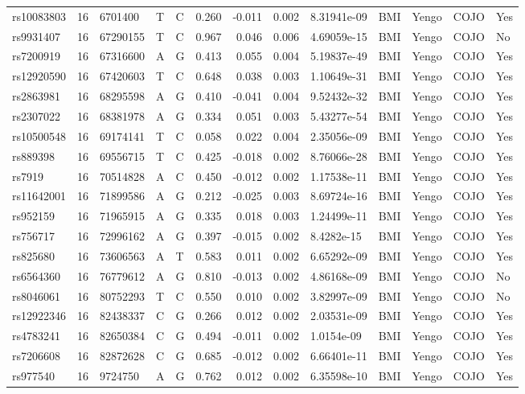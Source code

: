\documentclass[11pt,twoside]{bristolthesis}
\begin{document}
\begin{longtable}[t]{lrlllrrrlllll}
\addlinespace
rs10083803 & 16 & 6701400 & T & C & 0.260 & -0.011 & 0.002 & 8.31941e-09 & BMI & Yengo & COJO & Yes\\
rs9931407 & 16 & 67290155 & T & C & 0.967 & 0.046 & 0.006 & 4.69059e-15 & BMI & Yengo & COJO & No\\
rs7200919 & 16 & 67316600 & A & G & 0.413 & 0.055 & 0.004 & 5.19837e-49 & BMI & Yengo & COJO & Yes\\
rs12920590 & 16 & 67420603 & T & C & 0.648 & 0.038 & 0.003 & 1.10649e-31 & BMI & Yengo & COJO & Yes\\
rs2863981 & 16 & 68295598 & A & G & 0.410 & -0.041 & 0.004 & 9.52432e-32 & BMI & Yengo & COJO & Yes\\
\addlinespace
rs2307022 & 16 & 68381978 & A & G & 0.334 & 0.051 & 0.003 & 5.43277e-54 & BMI & Yengo & COJO & Yes\\
rs10500548 & 16 & 69174141 & T & C & 0.058 & 0.022 & 0.004 & 2.35056e-09 & BMI & Yengo & COJO & Yes\\
rs889398 & 16 & 69556715 & T & C & 0.425 & -0.018 & 0.002 & 8.76066e-28 & BMI & Yengo & COJO & Yes\\
rs7919 & 16 & 70514828 & A & C & 0.450 & -0.012 & 0.002 & 1.17538e-11 & BMI & Yengo & COJO & Yes\\
rs11642001 & 16 & 71899586 & A & G & 0.212 & -0.025 & 0.003 & 8.69724e-16 & BMI & Yengo & COJO & Yes\\
\addlinespace
rs952159 & 16 & 71965915 & A & G & 0.335 & 0.018 & 0.003 & 1.24499e-11 & BMI & Yengo & COJO & Yes\\
rs756717 & 16 & 72996162 & A & G & 0.397 & -0.015 & 0.002 & 8.4282e-15 & BMI & Yengo & COJO & Yes\\
rs825680 & 16 & 73606563 & A & T & 0.583 & 0.011 & 0.002 & 6.65292e-09 & BMI & Yengo & COJO & Yes\\
rs6564360 & 16 & 76779612 & A & G & 0.810 & -0.013 & 0.002 & 4.86168e-09 & BMI & Yengo & COJO & No\\
rs8046061 & 16 & 80752293 & T & C & 0.550 & 0.010 & 0.002 & 3.82997e-09 & BMI & Yengo & COJO & No\\
\addlinespace
rs12922346 & 16 & 82438337 & C & G & 0.266 & 0.012 & 0.002 & 2.03531e-09 & BMI & Yengo & COJO & Yes\\
rs4783241 & 16 & 82650384 & C & G & 0.494 & -0.011 & 0.002 & 1.0154e-09 & BMI & Yengo & COJO & Yes\\
rs7206608 & 16 & 82872628 & C & G & 0.685 & -0.012 & 0.002 & 6.66401e-11 & BMI & Yengo & COJO & Yes\\
rs977540 & 16 & 9724750 & A & G & 0.762 & 0.012 & 0.002 & 6.35598e-10 & BMI & Yengo & COJO & Yes\\

\end{longtable}
\end{document}
